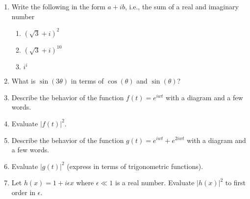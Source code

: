 \documentclass{article}
\begin{document}
\pagestyle{fancy}
\fancyhf{}
\rfoot{\thepage}
\renewcommand{\headrulewidth}{0pt}
\begin{enumerate}
\item Write the following in the form $a + ib$, i.e., the sum of a real and imaginary number
\begin{enumerate}[label = \alph*]
  \item $(\sqrt{3} + i)^2$
  \vspace{3cm}
  \item $(\sqrt{3} + i)^{10}$
  \vspace{3cm}
  \item $i^i$
  \vspace{2cm}
\end{enumerate}
\item What is $\sin(3\theta)$ in terms of $\cos(\theta)$ and $\sin(\theta)$?
\vspace{5cm}
\item Describe the behavior of the function $f(t) = e^{iwt}$ with a diagram and a few words.
  \vspace{4cm}
\item Evaluate $|f(t)|^2$.
  \vspace{4cm}
\item Describe the behavior of the function $g(t) = e^{iwt} + e^{2iwt}$ with a diagram and a few words.
  \vspace{5cm}
\item Evaluate $|g(t)|^2$ (express in terms of trigonometric functions).
  \vspace{5cm}
\item Let $h(x) = 1 + i\epsilon x$ where $\epsilon\ll 1$ is a real number.  Evaluate $|h(x)|^2$ to first order in $\epsilon$.
  \vspace{3cm}
\end{enumerate}
\end{document}
